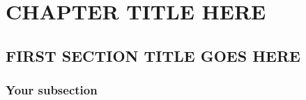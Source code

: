 
\chapter{CHAPTER TITLE HERE} %

\label{Chapter4} %

\section{FIRST SECTION TITLE GOES HERE}


\subsection{Your subsection}

